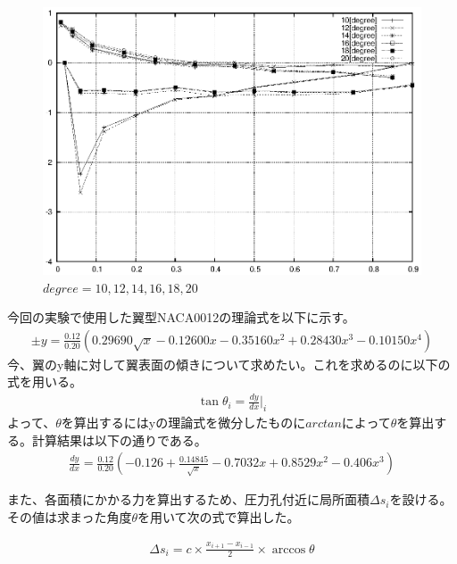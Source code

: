 \documentclass[a4j,twoside,openright,11pt]{jarticle}
\begin{document}
\begin{figure}[htbp]
\begin{center}
\includegraphics[width=12cm]{./2-CP/10-20.eps}
\end{center}
\caption{$degree = 10,12,14,16,18,20$}
\end{figure}

今回の実験で使用した翼型NACA0012の理論式を以下に示す。
\begin{eqnarray}
\pm y = \frac{0.12}{0.20}\left(0.29690\sqrt{x} -0.12600x -0.35160x^2 +0.28430x^3 -0.10150x^4 \right)
\end{eqnarray}
今、翼のy軸に対して翼表面の傾きについて求めたい。これを求めるのに以下の式を用いる。
\begin{eqnarray}
\tan \theta_i= \frac{dy}{dx}|_i
\end{eqnarray}
よって、$\theta$を算出するにはyの理論式を微分したものに$arctan$によって$\theta$を算出する。計算結果は以下の通りである。
\begin{eqnarray}
\frac{dy}{dx} = \frac{0.12}{0.20}(-0.126+\frac{0.14845}{\sqrt x}-0.7032x+0.8529x^2-0.406x^3)
\end{eqnarray}

また、各面積にかかる力を算出するため、圧力孔付近に局所面積$\Delta s_i$を設ける。その値は求まった角度$\theta$を用いて次の式で算出した。

\begin{eqnarray}
\Delta s_i = c \times \frac{x_{i+1} - x_{i-1}}{2} \times \arccos \theta
\end{eqnarray}
\end{document}
